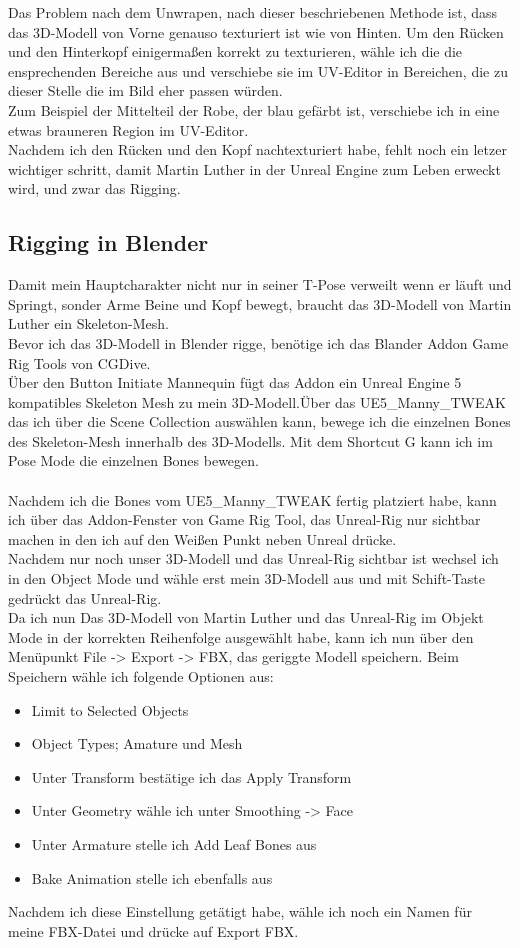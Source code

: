 Das Problem nach dem Unwrapen, nach dieser beschriebenen Methode ist, dass das 3D-Modell von Vorne genauso texturiert ist wie von Hinten. Um den Rücken und den Hinterkopf einigermaßen korrekt zu texturieren, wähle ich die die ensprechenden Bereiche aus und verschiebe sie im UV-Editor in Bereichen, die zu dieser Stelle die im Bild eher passen würden.
\\
Zum Beispiel der Mittelteil der Robe, der blau gefärbt ist, verschiebe ich in eine etwas brauneren Region im UV-Editor.
\\
Nachdem ich den Rücken und den Kopf nachtexturiert habe, fehlt noch ein letzer wichtiger schritt, damit Martin Luther in der Unreal Engine zum Leben erweckt wird, und zwar das Rigging.


\subsection{Rigging in Blender}%
Damit mein Hauptcharakter nicht nur in seiner T-Pose verweilt wenn er läuft und Springt, sonder Arme Beine und Kopf bewegt, braucht das 3D-Modell von Martin Luther ein Skeleton-Mesh.
\\
Bevor ich das 3D-Modell in Blender rigge, benötige ich das Blander Addon Game Rig Tools von CGDive.
\\
Über den Button Initiate Mannequin fügt das Addon ein Unreal Engine 5 kompatibles Skeleton Mesh zu mein 3D-Modell.Über das UE5\_Manny\_TWEAK das ich über die Scene Collection auswählen kann, bewege ich die einzelnen Bones des Skeleton-Mesh innerhalb des 3D-Modells. Mit dem Shortcut G kann ich im Pose Mode die einzelnen Bones bewegen.
\\
\\
Nachdem ich die Bones vom UE5\_Manny\_TWEAK fertig platziert habe, kann ich über das Addon-Fenster von Game Rig Tool, das Unreal-Rig nur sichtbar machen in den ich auf den Weißen Punkt neben Unreal drücke. 
\\
Nachdem nur noch unser 3D-Modell und das Unreal-Rig sichtbar ist wechsel ich in den Object Mode und wähle erst mein 3D-Modell aus und mit Schift-Taste gedrückt das Unreal-Rig.
\\
Da ich nun Das 3D-Modell von Martin Luther und das Unreal-Rig im Objekt Mode in der korrekten Reihenfolge ausgewählt habe, kann ich nun über den Menüpunkt File -> Export -> FBX, das geriggte Modell speichern. Beim Speichern wähle ich folgende Optionen aus:
\begin{itemize}
	\item Limit to Selected Objects 
	\item Object Types; Amature und Mesh
	\item Unter Transform bestätige ich das Apply Transform
	\item Unter Geometry wähle ich unter Smoothing -> Face
	\item Unter Armature stelle ich Add Leaf Bones aus
	\item Bake Animation stelle ich ebenfalls aus
\end{itemize}
Nachdem ich diese Einstellung getätigt habe, wähle ich noch ein Namen für meine FBX-Datei und drücke auf Export FBX.


